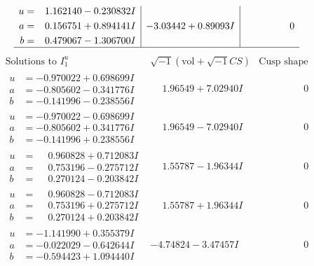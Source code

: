 \documentclass[1p]{elsarticle_modified}
\theoremstyle{definition}
\newcommand{\I}{\sqrt{-1}}
\begin{document}
$$\begin{array}{c|c|c}
\begin{aligned}
u &= \phantom{-}1.162140 - 0.230832 I \\
a &= \phantom{-}0.156751 + 0.894141 I \\
b &= \phantom{-}0.479067 - 1.306700 I\end{aligned}
 & -3.03442 + 0.89093 I & \phantom{-0.000000 } 0\\
 \hline 
 \end{array}$$\newpage$$\begin{array}{c|c|c}  
\text{Solutions to }I^u_{1}& \I (\text{vol} + \sqrt{-1}CS) & \text{Cusp shape}\\
 \hline 
\begin{aligned}
u &= -0.970022 + 0.698699 I \\
a &= -0.805602 - 0.341776 I \\
b &= -0.141996 - 0.238556 I\end{aligned}
 & \phantom{-}1.96549 + 7.02940 I & \phantom{-0.000000 } 0 \\ \hline\begin{aligned}
u &= -0.970022 - 0.698699 I \\
a &= -0.805602 + 0.341776 I \\
b &= -0.141996 + 0.238556 I\end{aligned}
 & \phantom{-}1.96549 - 7.02940 I & \phantom{-0.000000 } 0 \\ \hline\begin{aligned}
u &= \phantom{-}0.960828 + 0.712083 I \\
a &= \phantom{-}0.753196 - 0.275712 I \\
b &= \phantom{-}0.270124 - 0.203842 I\end{aligned}
 & \phantom{-}1.55787 - 1.96344 I & \phantom{-0.000000 } 0 \\ \hline\begin{aligned}
u &= \phantom{-}0.960828 - 0.712083 I \\
a &= \phantom{-}0.753196 + 0.275712 I \\
b &= \phantom{-}0.270124 + 0.203842 I\end{aligned}
 & \phantom{-}1.55787 + 1.96344 I & \phantom{-0.000000 } 0 \\ \hline\begin{aligned}
u &= -1.141990 + 0.355379 I \\
a &= -0.022029 - 0.642644 I \\
b &= -0.594423 + 1.094440 I\end{aligned}
 & -4.74824 - 3.47457 I & \phantom{-0.000000 } 0 \\ \hline\begin{aligned}

\end{aligned}
\end{array}$$
\end{document}
